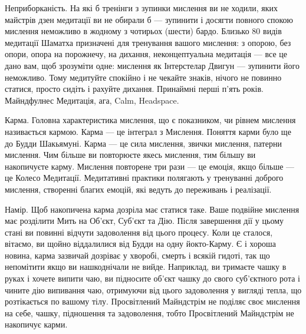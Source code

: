 Неприборканість. На які б тренінги з зупинки мислення ви не ходили,
яких майстрів дзен медитації ви не обирали б --- зупинити і досягти повного
спокою мислення неможливо в жодному з чотирьох (шести) бардо. Близько 80 видів медитації
Шаматха призначені для тренування вашого мислення: з опорою, без опори, опора на порожнечу,
на дихання, неконцептуальна медитація --- все це дано вам, щоб зрозуміти одне:
мислення як Інтерстелар Двигун --- зупинити його неможливо. Тому медитуйте спокійно
і не чекайте знаків, нічого не повинно статися, просто сидіть і рахуйте дихання.
Принаймні перші п'ять років. Майндфулнес Медитація, ага, Calm, Headspace.

Карма. Головна характеристика мислення, що є показником, чи рівнем мислення
називається кармою. Карма --- це інтеграл з Мислення. Поняття карми було ще
до Будди Шакьямуні. Карма --- це сила мислення, звички мислення, патерни мислення.
Чим більше ви повторюєте якесь мислення, тим більшу ви накопичуєте карму.
Мислення повторене три рази --- це емоція, якщо більше --- це Колесо Медитації.
Медитативні практики полягають у тренуванні доброго мислення, створенні благих емоцій,
які ведуть до переживань і реалізації.

Намір. Щоб накопичена карма дозріла має статися таке. Ваше подвійне мислення
має розділити Мить на Об'єкт, Суб'єкт та Дію. Після завершення дії у цьому стані
ви повинні відчути задоволення від цього процесу. Коли це сталося, вітаємо,
ви щойно віддалилися від Будди на одну йокто-Карму. Є і хороша новина, карма
зазвичай дозріває у хворобі, смерть і всякій гидоті, так що непомітити якщо
ви нашкоднічали не вийде. Наприклад, ви тримаєте чашку в руках і хочете випити чаю,
ви підносите об'єкт чашку до свого суб'єктного рота і чините дію випивання чаю,
отримуючи від цього задоволення у вигляді тепла, що розтікається по вашому тілу.
Просвітлений Майндстрім не поділяє своє мислення на себе, чашку, підношення та
задоволення, тобто Просвітлений Майндстрім не накопичує карми.